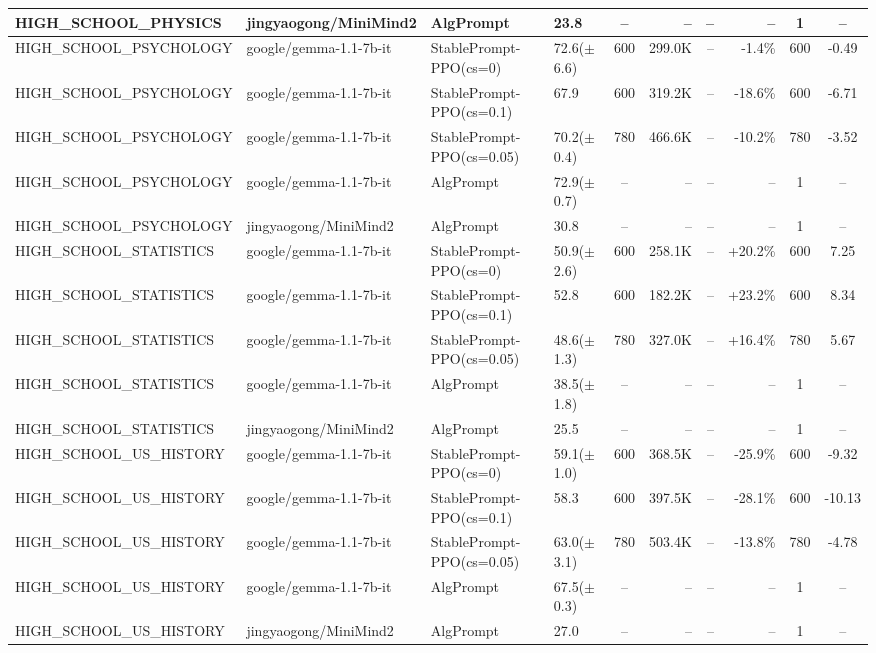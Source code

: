 {\begin{longtable}{@{}p{5.5cm}p{4.5cm}p{2.5cm}lcrrrcc@{}}
\midrule
HIGH\_SCHOOL\_PHYSICS & jingyaogong/MiniMind2 & AlgPrompt & 23.8 & -- & -- & -- & -- & 1 & -- \\
\midrule
HIGH\_SCHOOL\_PSYCHOLOGY & google/gemma-1.1-7b-it & StablePrompt-PPO(cs=0) & 72.6($\pm$6.6) & 600 & 299.0K & -- & -1.4\% & 600 & -0.49 \\
HIGH\_SCHOOL\_PSYCHOLOGY & google/gemma-1.1-7b-it & StablePrompt-PPO(cs=0.1) & 67.9 & 600 & 319.2K & -- & -18.6\% & 600 & -6.71 \\
HIGH\_SCHOOL\_PSYCHOLOGY & google/gemma-1.1-7b-it & StablePrompt-PPO(cs=0.05) & 70.2($\pm$0.4) & 780 & 466.6K & -- & -10.2\% & 780 & -3.52 \\
HIGH\_SCHOOL\_PSYCHOLOGY & google/gemma-1.1-7b-it & AlgPrompt & 72.9($\pm$0.7) & -- & -- & -- & -- & 1 & -- \\
\midrule
HIGH\_SCHOOL\_PSYCHOLOGY & jingyaogong/MiniMind2 & AlgPrompt & 30.8 & -- & -- & -- & -- & 1 & -- \\
\midrule
HIGH\_SCHOOL\_STATISTICS & google/gemma-1.1-7b-it & StablePrompt-PPO(cs=0) & 50.9($\pm$2.6) & 600 & 258.1K & -- & +20.2\% & 600 & 7.25 \\
HIGH\_SCHOOL\_STATISTICS & google/gemma-1.1-7b-it & StablePrompt-PPO(cs=0.1) & 52.8 & 600 & 182.2K & -- & +23.2\% & 600 & 8.34 \\
HIGH\_SCHOOL\_STATISTICS & google/gemma-1.1-7b-it & StablePrompt-PPO(cs=0.05) & 48.6($\pm$1.3) & 780 & 327.0K & -- & +16.4\% & 780 & 5.67 \\
HIGH\_SCHOOL\_STATISTICS & google/gemma-1.1-7b-it & AlgPrompt & 38.5($\pm$1.8) & -- & -- & -- & -- & 1 & -- \\
\midrule
HIGH\_SCHOOL\_STATISTICS & jingyaogong/MiniMind2 & AlgPrompt & 25.5 & -- & -- & -- & -- & 1 & -- \\
\midrule
HIGH\_SCHOOL\_US\_HISTORY & google/gemma-1.1-7b-it & StablePrompt-PPO(cs=0) & 59.1($\pm$1.0) & 600 & 368.5K & -- & -25.9\% & 600 & -9.32 \\
HIGH\_SCHOOL\_US\_HISTORY & google/gemma-1.1-7b-it & StablePrompt-PPO(cs=0.1) & 58.3 & 600 & 397.5K & -- & -28.1\% & 600 & -10.13 \\
HIGH\_SCHOOL\_US\_HISTORY & google/gemma-1.1-7b-it & StablePrompt-PPO(cs=0.05) & 63.0($\pm$3.1) & 780 & 503.4K & -- & -13.8\% & 780 & -4.78 \\
HIGH\_SCHOOL\_US\_HISTORY & google/gemma-1.1-7b-it & AlgPrompt & 67.5($\pm$0.3) & -- & -- & -- & -- & 1 & -- \\
\midrule
HIGH\_SCHOOL\_US\_HISTORY & jingyaogong/MiniMind2 & AlgPrompt & 27.0 & -- & -- & -- & -- & 1 & -- \\

\end{longtable}}
